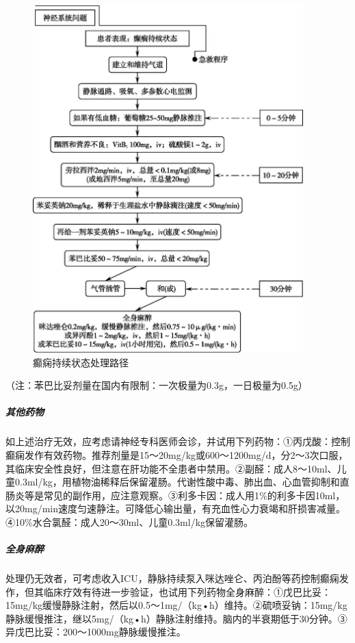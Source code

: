 \begin{figure}[!htbp]
 \centering
 \includegraphics[width=4.11458in,height=5.28125in]{./images/Image00038.jpg}
 \captionsetup{justification=centering}
 \caption{癫痫持续状态处理路径}
 \label{fig5-3}
  \end{figure} 

（注：苯巴比妥剂量在国内有限制：一次极量为0.3g，一日极量为0.5g）

\subparagraph{其他药物}

如上述治疗无效，应考虑请神经专科医师会诊，并试用下列药物：①丙戊酸：控制癫痫发作有效药物。推荐剂量是15～20mg/kg或600～1200mg/d，分2～3次口服，其临床安全性良好，但注意在肝功能不全患者中禁用。②副醛：成人8～10ml、儿童0.3ml/kg，用植物油稀释后保留灌肠。代谢性酸中毒、肺出血、心血管抑制和直肠炎等是常见的副作用，应注意观察。③利多卡因：成人用1\%的利多卡因10ml，以20mg/min速度匀速静注。可降低心输出量，有充血性心力衰竭和肝损害减量。④10\%水合氯醛：成人20～30ml、儿童0.3ml/kg保留灌肠。

\subparagraph{全身麻醉}

处理仍无效者，可考虑收入ICU，静脉持续泵入咪达唑仑、丙泊酚等药控制癫痫发作，但其临床疗效有待进一步验证，也试用下列药物全身麻醉：①戊巴比妥：15mg/kg缓慢静脉注射，然后以0.5～1mg/（kg•h）维持。②硫喷妥钠：15mg/kg静脉缓慢推注，继以5mg/（kg•h）静脉注射维持。脑内的半衰期低于30分钟。③异戊巴比妥：200～1000mg静脉缓慢推注。

